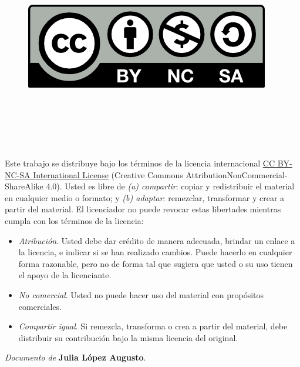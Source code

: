 
\cleardoublepage

\begin{figure}
 \ \ \ \ \includegraphics[width=0.25\linewidth]{figs/by-nc-sa.png}
 \label{fig:cc} 
 \end{figure}

\

\

\

\noindent
Este trabajo se distribuye bajo los términos de la licencia internacional \href{http://creativecommons.org/licenses/by-nc-sa/4.0/}{CC BY-NC-SA International License} (Creative Commons AttributionNonCommercial-ShareAlike 4.0). Usted es libre de \textit{(a) compartir}: copiar y redistribuir el material en cualquier medio o formato; y \textit{(b) adaptar}: remezclar, transformar y crear a partir del material. El licenciador no puede revocar estas libertades mientras cumpla con los términos de la licencia:

\begin{itemize}
\item \textit{Atribución}. Usted debe dar crédito de manera adecuada, brindar un enlace a la licencia, e indicar si se han realizado cambios. Puede hacerlo en cualquier forma razonable, pero no de forma tal que sugiera que usted o su uso tienen el apoyo de la licenciante.
\item \textit{No comercial}. Usted no puede hacer uso del material con propósitos comerciales.
\item \textit{Compartir igual}. Si remezcla, transforma o crea a partir del material, debe distribuir su contribución bajo la misma licencia del original.
\end{itemize}

\begin{flushright}
		\vspace{7.0 cm}
		\emph{Documento de} \textbf{Julia López Augusto}. %
\end{flushright}

